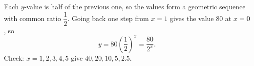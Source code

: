 Each $y$-value is half of the previous one, so the values form a geometric sequence with common ratio $\dfrac{1}{2}$. Going back one step from $x=1$ gives the value $80$ at $x=0$, so
\[
\boxed{y=80\left(\dfrac{1}{2}\right)^{x}=\dfrac{80}{2^{x}}} .
\]
Check: $x=1,2,3,4,5$ give $40,20,10,5,2.5$.
